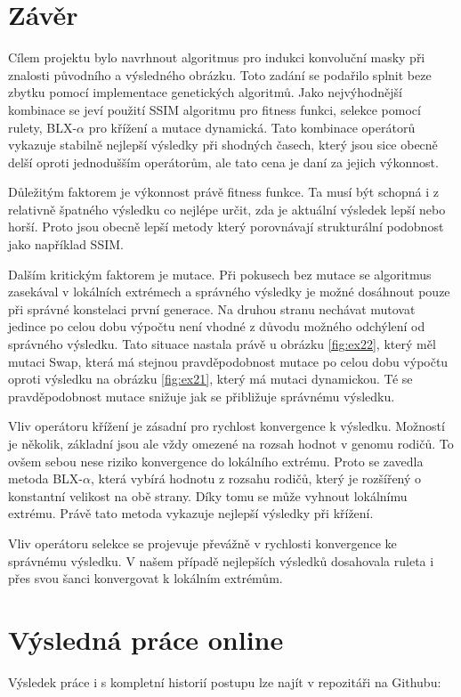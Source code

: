 \documentclass[a4paper,11pt,titlepage]{scrartcl}
\begin{document}
\newpage
\section{Závěr}
Cílem projektu bylo navrhnout algoritmus pro indukci konvoluční masky při znalosti původního a výsledného obrázku. Toto zadání se podařilo splnit beze zbytku pomocí implementace genetických algoritmů. Jako nejvýhodnější kombinace se jeví použití SSIM algoritmu pro fitness funkci, selekce pomocí rulety, BLX-$\alpha$ pro křížení a mutace dynamická. Tato kombinace operátorů vykazuje stabilně nejlepší výsledky při shodných časech, který jsou sice obecně delší oproti jednodušším operátorům, ale tato cena je daní za jejich výkonnost.

Důležitým faktorem je výkonnost právě fitness funkce. Ta musí být schopná i z relativně špatného výsledku co nejlépe určit, zda je aktuální výsledek lepší nebo horší. Proto jsou obecně lepší metody který porovnávají strukturální podobnost jako například SSIM.

Dalším kritickým faktorem je mutace. Při pokusech bez mutace se algoritmus zasekával v lokálních extrémech a správného výsledky je možné dosáhnout pouze při správné konstelaci první generace. Na druhou stranu nechávat mutovat jedince po celou dobu výpočtu není vhodné z důvodu možného odchýlení od správného výsledku. Tato situace nastala právě u obrázku \ref{fig:ex22}, který měl mutaci Swap, která má stejnou pravděpodobnost mutace po celou dobu výpočtu oproti výsledku na obrázku \ref{fig:ex21}, který má mutaci dynamickou. Té se pravděpodobnost mutace snižuje jak se přibližuje správnému výsledku.

Vliv operátoru křížení je zásadní pro rychlost konvergence k výsledku. Možností je několik, základní jsou ale vždy omezené na rozsah hodnot v genomu rodičů. To ovšem sebou nese riziko konvergence do lokálního extrému. Proto se zavedla metoda BLX-$\alpha$, která vybírá hodnotu z rozsahu rodičů, který je rozšířený o konstantní velikost na obě strany. Díky tomu se může vyhnout lokálnímu extrému. Právě tato metoda vykazuje nejlepší výsledky při křížení.

Vliv operátoru selekce se projevuje převážně v rychlosti konvergence ke správnému výsledku. V našem případě nejlepších výsledků dosahovala ruleta i přes svou šanci konvergovat k lokálním extrémům. 

\section{Výsledná práce online}
Výsledek práce i s kompletní historií postupu lze najít v repozitáři na Githubu:
\end{document}
